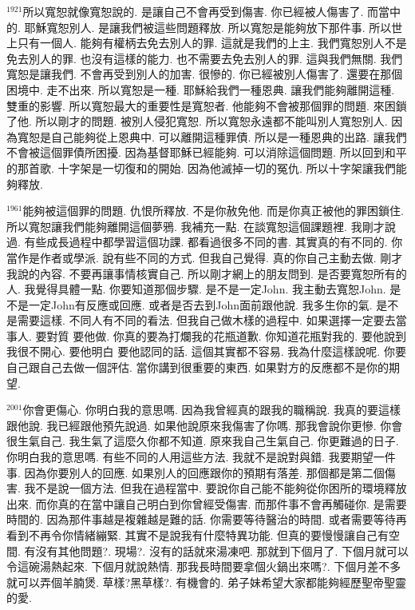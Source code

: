 \documentclass{book}
\begin{document}
$^{1921}$所以寬恕就像寬恕說的.
是讓自己不會再受到傷害.
你已經被人傷害了.
而當中的.
耶穌寬恕別人.
是讓我們被這些問題釋放.
所以寬恕是能夠放下那件事.
所以世上只有一個人.
能夠有權柄去免去別人的罪.
這就是我們的上主.
我們寬恕別人不是免去別人的罪.
也沒有這樣的能力.
也不需要去免去別人的罪.
這與我們無關.
我們寬恕是讓我們.
不會再受到別人的加害.
很慘的.
你已經被別人傷害了.
還要在那個困境中.
走不出來.
所以寬恕是一種.
耶穌給我們一種恩典.
讓我們能夠離開這種.
雙重的影響.
所以寬恕最大的重要性是寬恕者.
他能夠不會被那個罪的問題.
來困鎖了他.
所以剛才的問題.
被別人侵犯寬恕.
所以寬恕永遠都不能叫別人寬恕別人.
因為寬恕是自己能夠從上恩典中.
可以離開這種罪債.
所以是一種恩典的出路.
讓我們不會被這個罪債所困擾.
因為基督耶穌已經能夠.
可以消除這個問題.
所以回到和平的那首歌.
十字架是一切復和的開始.
因為他滅掉一切的冤仇.
所以十字架讓我們能夠釋放.

$^{1961}$能夠被這個罪的問題.
仇恨所釋放.
不是你赦免他.
而是你真正被他的罪困鎖住.
所以寬恕讓我們能夠離開這個夢鴉.
我補充一點.
在談寬恕這個課題裡.
我剛才說過.
有些成長過程中都學習這個功課.
都看過很多不同的書.
其實真的有不同的.
你當作是作者或學派.
說有些不同的方式.
但我自己覺得.
真的你自己主動去做.
剛才我說的內容.
不要再讓事情核實自己.
所以剛才網上的朋友問到.
是否要寬恕所有的人.
我覺得具體一點.
你要知道那個步驟.
是不是一定John.
我主動去寬恕John.
是不是一定John有反應或回應.
或者是否去到John面前跟他說.
我多生你的氣.
是不是需要這樣.
不同人有不同的看法.
但我自己做木樣的過程中.
如果選擇一定要去當事人.
要對質 要他做.
你真的要為打爛我的花瓶道歉.
你知道花瓶對我的.
要他說到我很不開心.
要他明白 要他認同的話.
這個其實都不容易.
我為什麼這樣說呢.
你要自己跟自己去做一個評估.
當你講到很重要的東西.
如果對方的反應都不是你的期望.

$^{2001}$你會更傷心.
你明白我的意思嗎.
因為我曾經真的跟我的職稱說.
我真的要這樣跟他說.
我已經跟他預先說過.
如果他說原來我傷害了你嗎.
那我會說你更慘.
你會很生氣自己.
我生氣了這麼久你都不知道.
原來我自己生氣自己.
你更難過的日子.
你明白我的意思嗎.
有些不同的人用這些方法.
我就不是說對與錯.
我要期望一件事.
因為你要別人的回應.
如果別人的回應跟你的預期有落差.
那個都是第二個傷害.
我不是說一個方法.
但我在過程當中.
要說你自己能不能夠從你困所的環境釋放出來.
而你真的在當中讓自己明白到你曾經受傷害.
而那件事不會再觸碰你.
是需要時間的.
因為那件事越是複雜越是難的話.
你需要等待醫治的時間.
或者需要等待再看到不再令你情緒繃緊.
其實不是說我有什麼特異功能.
但真的要慢慢讓自己有空間.
有沒有其他問題?.
現場?.
沒有的話就來湯凍吧.
那就到下個月了.
下個月就可以令這碗湯熱起來.
下個月就說熱情.
那我長時間要拿個火鍋出來嗎?.
下個月差不多就可以弄個羊腩煲.
草樣?黑草樣?.
有機會的.
弟子妹希望大家都能夠經歷聖帝聖靈的愛.
\end{document}
